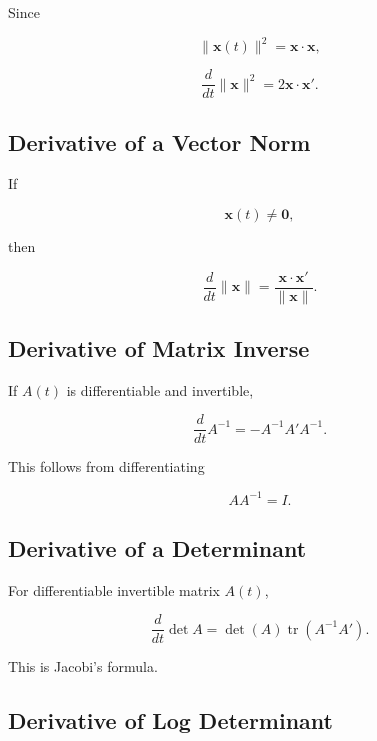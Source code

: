 Since

\[
\|\mathbf{x}(t)\|^2
=
\mathbf{x}\cdot\mathbf{x},
\]

\[
\boxed{
\frac{d}{dt}
\|\mathbf{x}\|^2
=
2\mathbf{x}\cdot\mathbf{x}'.
}
\]

\subsection{Derivative of a Vector Norm}
\label{subsec:norm-derivative}

If

\[
\mathbf{x}(t)\neq\mathbf{0},
\]

then

\[
\boxed{
\frac{d}{dt}
\|\mathbf{x}\|
=
\frac{
\mathbf{x}\cdot\mathbf{x}'
}{
\|\mathbf{x}\|
}.
}
\]

\subsection{Derivative of Matrix Inverse}
\label{subsec:matrix-inverse-derivative}

If \(A(t)\) is differentiable and invertible,

\[
\boxed{
\frac{d}{dt}
A^{-1}
=
-A^{-1}A'A^{-1}.
}
\]

This follows from differentiating

\[
AA^{-1}=I.
\]

\subsection{Derivative of a Determinant}
\label{subsec:determinant-derivative}

For differentiable invertible matrix \(A(t)\),

\[
\boxed{
\frac{d}{dt}
\det A
=
\det(A)
\operatorname{tr}
\left(
A^{-1}A'
\right).
}
\]

This is Jacobi's formula.

\subsection{Derivative of Log Determinant}
\label{subsec:logdet-derivative}

